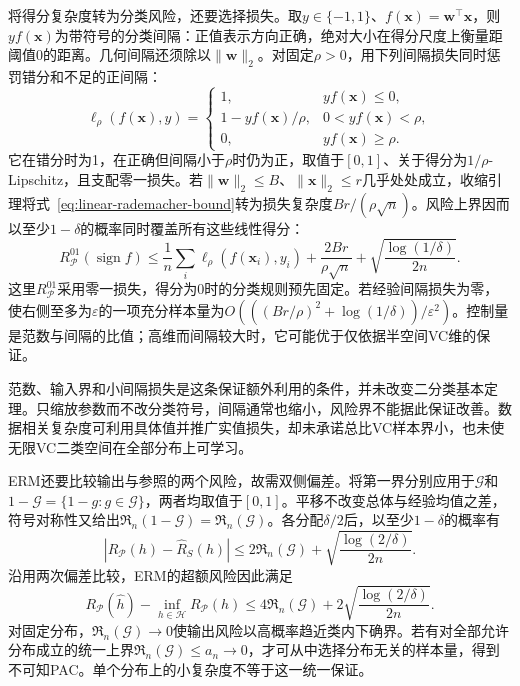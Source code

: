 将得分复杂度转为分类风险，还要选择损失。取$y\in\{-1,1\}$、$f(\bm x)=\bm w^\top\bm x$，则$yf(\bm x)$为带符号的分类间隔：正值表示方向正确，绝对大小在得分尺度上衡量距阈值0的距离。几何间隔还须除以$\|\bm w\|_2$。对固定$\rho>0$，用下列间隔损失同时惩罚错分和不足的正间隔：
\[
 \ell_\rho(f(\bm x),y)=
 \begin{cases}
  1,&yf(\bm x)\leq0,\\
  1-yf(\bm x)/\rho,&0<yf(\bm x)<\rho,\\
  0,&yf(\bm x)\geq\rho.
 \end{cases}
\]
它在错分时为1，在正确但间隔小于$\rho$时仍为正，取值于$[0,1]$、关于得分为$1/\rho$-Lipschitz，且支配零一损失。若$\|\bm w\|_2\leq B$、$\|\bm x\|_2\leq r$几乎处处成立，收缩引理将式~\eqref{eq:linear-rademacher-bound}转为损失复杂度$Br/(\rho\sqrt n)$。风险上界因而以至少$1-\delta$的概率同时覆盖所有这些线性得分：
\begin{equation}
 R_{\mathcal P}^{01}(\operatorname{sign}f)
 \leq\frac1n\sum_i\ell_\rho(f(\bm x_i),y_i)
 +\frac{2Br}{\rho\sqrt n}
 +\sqrt{\frac{\log(1/\delta)}{2n}}.
 \label{eq:rademacher-margin-risk}
\end{equation}
这里$R_{\mathcal P}^{01}$采用零一损失，得分为0时的分类规则预先固定。若经验间隔损失为零，使右侧至多为$\varepsilon$的一项充分样本量为$O(((Br/\rho)^2+\log(1/\delta))/\varepsilon^2)$。控制量是范数与间隔的比值；高维而间隔较大时，它可能优于仅依据半空间VC维的保证。

范数、输入界和小间隔损失是这条保证额外利用的条件，并未改变二分类基本定理。只缩放参数而不改分类符号，间隔通常也缩小，风险界不能据此保证改善。数据相关复杂度可利用具体值并推广实值损失，却未承诺总比VC样本界小，也未使无限VC二类空间在全部分布上可学习。

ERM还要比较输出与参照的两个风险，故需双侧偏差。将第一界分别应用于$\mathcal G$和$1-\mathcal G=\{1-g:g\in\mathcal G\}$，两者均取值于$[0,1]$。平移不改变总体与经验均值之差，符号对称性又给出$\mathfrak R_n(1-\mathcal G)=\mathfrak R_n(\mathcal G)$。各分配$\delta/2$后，以至少$1-\delta$的概率有
\[
 |R_{\mathcal P}(h)-\hat R_S(h)|
 \leq2\mathfrak R_n(\mathcal G)+\sqrt{\frac{\log(2/\delta)}{2n}}.
\]
沿用两次偏差比较，ERM的超额风险因此满足
\begin{equation}
 R_{\mathcal P}(\hat h)-\inf_{h\in\mathcal H}R_{\mathcal P}(h)
 \leq4\mathfrak R_n(\mathcal G)
 +2\sqrt{\frac{\log(2/\delta)}{2n}}.
 \label{eq:rademacher-excess-risk}
\end{equation}
对固定分布，$\mathfrak R_n(\mathcal G)\to0$使输出风险以高概率趋近类内下确界。若有对全部允许分布成立的统一上界$\mathfrak R_n(\mathcal G)\leq a_n\to0$，才可从中选择分布无关的样本量，得到不可知PAC。单个分布上的小复杂度不等于这一统一保证。

